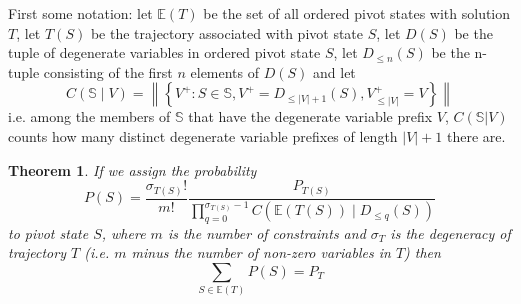 \documentclass{article}
\newtheorem{theorem}{Theorem}
\begin{document}
First some notation: let $\mathbb{E}(T)$ be the set of all ordered pivot states with solution $T$, let $T(S)$ be the trajectory associated with pivot state $S$, let $D(S)$ be the tuple of degenerate variables in ordered pivot state $S$, let $D_{\le n}(S)$ be the n-tuple consisting of the first $n$ elements of $D(S)$ and let
\begin{equation}
C(\mathbb{S} \mid V) = \left\|\left\{ V^+ :  S \in \mathbb{S}, V^+ = D_{\le |V|+1}(S), V^+_{\le |V|}=V \right\}\right\|
\label{count}
\end{equation}
i.e. among the members of $\mathbb{S}$ that have the degenerate variable prefix $V$, $C(\mathbb{S}|V)$ counts how many distinct degenerate variable prefixes of length $|V|+1$ there are.




\begin{theorem}
	If we assign the probability
	\begin{equation}
	P(S) =  \frac{\sigma_{T(S)}!}{m!} \frac{P_{T(S)}}{\prod_{q=0}^{\sigma_{T(S)}-1} C(\mathbb{E}(T(S)) \mid D_{\le q}(S))}
	\label{pivotProb}
	\end{equation}
	to pivot state $S$, where $m$ is the number of constraints and $\sigma_{T}$ is the degeneracy of trajectory $T$ (i.e. $m$ minus the number of non-zero variables in $T$) then
	\[
	\sum_{S \in \mathbb{E}(T)} P(S) = P_{T}
	\]
\end{theorem}
\end{document}
